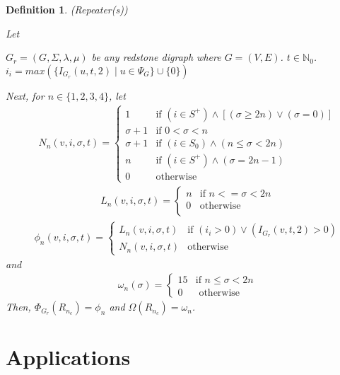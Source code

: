 \documentclass{article}
\newtheorem{defn}{Definition}[section]
\begin{document}
\begin{defn} (Repeater(s))
	
	Let
	\begin{outline}
	\1 \(G_{r} = (G, \Sigma, \lambda, \mu)\) be any redstone digraph where \(G = (V, E)\).
	\1 \(t \in \mathbb{N}_{0}\).
	\1 \(i_{i} = max(\{I_{G_{r}}(u, t, 2) \mid u \in \Psi_{G}\} \cup \{0\})\)
	\end{outline}
	Next, for \(n \in \{1, 2, 3, 4\}\), let
	\begin{align}
		& N_{n}(v, i, \sigma, t) = 
		\begin{cases}
			1		   & \text{if }	 (i \in S^+) \land [(\sigma \geq 2n) \vee (\sigma = 0)]\\
			\sigma + 1 & \text{if }	 0 < \sigma < n \\
			\sigma + 1 & \text{if }	 (i \in S_{0}) \land (n \leq \sigma < 2n) \\
			n		   & \text{if }	 (i \in S^+) \land (\sigma = 2n - 1) \\
			0		   & \text{otherwise}
		\end{cases}
	\end{align}
	\begin{align}
		& L_{n}(v, i, \sigma, t) = 
		\begin{cases}
			n & \text{if }	n <= \sigma < 2n \\
			0 & \text{otherwise} \\
		\end{cases}
	\end{align}
	\begin{align}
		& \phi_{n}(v, i, \sigma, t) = 
		\begin{cases}
			L_{n}(v, i, \sigma, t) & \text{if } (i_{i} > 0) \vee (I_{G_{r}}(v, t, 2) > 0)\\
			N_{n}(v, i, \sigma, t) & \text{otherwise}
		\end{cases}
	\end{align}	
	and
	\begin{align}
		& \omega_{n}(\sigma) = 
		\begin{cases}
			15 & \text{if } n \leq \sigma < 2n \\
			0 & \text{ otherwise }
			\end{cases}
	\end{align}
	Then, \(\Phi_{G_{r}}(R_{n_c}) = \phi_{n}\) and \(\Omega(R_{n_{c}}) = \omega_{n}\).
\end{defn}

\section{Applications}
\end{document}
